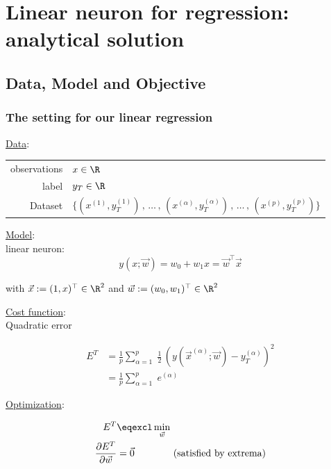 \section{Linear neuron for regression: analytical solution}

\subsection{Data, Model and Objective}

\begin{frame}\frametitle{The setting for our linear regression}

\underline{Data}:\\

\begin{table}[h]
\begin{tabular}{rl}
observations & $x \in \R$ \\
label         & $y_{T} \in \R$ \\
Dataset       & 
$
\Big\{
	\left(x^{(1)}, y_T^{(1)} 
	\right)
	\,,\, \ldots \,,\,
	\left( x^{(\alpha)}, y_T^{(\alpha)} \right)
	\,,\, \ldots \,,\, 
	\left( x^{(p)}, y_T^{(p)} \right) 
\Big\}
$
\end{tabular}
\end{table}

\underline{Model}:\\

linear neuron:
\begin{equation}
    y(x; \vec w) = w_{0} + w_{1} x = \vec w^{\top} \vec x
\end{equation}

with $\vec x := (1, x)^{\top} \in \R^{2}$ and $\vec w := (w_{0}, w_{1})^{\top} \in \R^{2}$

\end{frame}

\begin{frame}

\underline{Cost function}:\\

Quadratic error

\begin{align}
E^{T} &= \frac{1}{p} \sum_{\alpha=1}^{p} \;
\frac{1}{2} \, \left( y(\vec x^{(\alpha)}; \vec w)- y^{(\alpha)}_{T}\right)^{2}\\
&= \frac{1}{p} \sum_{\alpha=1}^{p}
\;e^{(\alpha)}
\end{align}


\underline{Optimization}:\\

\pause

\begin{align}
E^{T} &\eqexcl \min_{\vec w}\\
\frac{\partial E^{T}}{\partial \vec w} &= \vec 0 \qquad\qquad \text{(satisfied by extrema)}
\label{eq:extremacond}
\end{align}
    
\end{frame}

